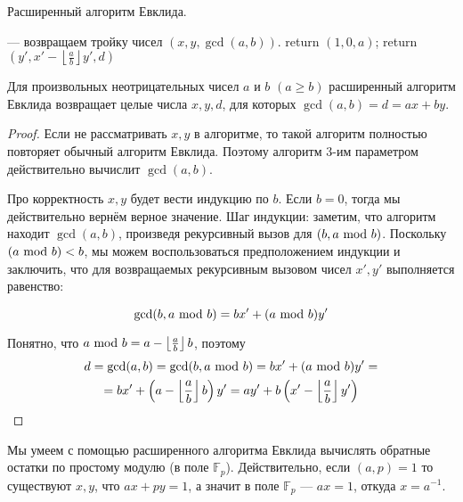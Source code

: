 \documentclass[a4paper, 12pt]{article}
\begin{document}
\begin{algorithm}
  \caption{Расширенный алгоритм Евклида.}
  \begin{algorithmic}[1]
     \Comment --- возвращаем тройку чисел $(x, y, \gcd(a, b))$.
        \State return $(1, 0, a)$;
      \EndIf
      \State return $(y', x' - \left\lfloor\frac{a}{b}\right\rfloor y', d)$
    \EndFunction
  \end{algorithmic}
\end{algorithm}

\begin{Lemma}
  Для произвольных неотрицательных чисел $a$ и $b$ $(a \geqslant b)$ расширенный
алгоритм Евклида возвращает целые числа $x, y, d$, для которых $\gcd(a, b) = d = ax + by$.
\end{Lemma}

\begin{proof}
  Если не рассматривать $x, y$ в алгоритме, то такой алгоритм полностью
  повторяет обычный алгоритм Евклида. Поэтому алгоритм 3-им параметром 
  действительно вычислит $\gcd(a, b)$.

  Про корректность $x, y$ будет вести индукцию по $b$. Если $b = 0$, тогда мы действительно вернём верное значение. Шаг индукции: заметим, что алгоритм находит $\gcd(a, b)$, произведя рекурсивный вызов для $(b, a \ \text{mod} \  b)$. Поскольку $(a \ \text{mod} \  b) < b$, мы можем
  воспользоваться предположением индукции и заключить, что для возвращаемых рекурсивным вызовом чисел $x', y'$ выполняется равенство:

  \[
    \gcd(b, a \ \text{mod} \  b) = bx' + (a \ \text{mod} \  b)y'
  \]

  Понятно, что $a \ \text{mod} \  b = a - \left\lfloor\frac{a}{b}\right\rfloor b$, поэтому
  \begin{multline*}
    d = \gcd(a, b) = \gcd(b, a \ \text{mod} \  b) = bx' + (a \ \text{mod} \  b)y' =\\
    = bx' + \left(a - \left\lfloor\frac{a}{b}\right\rfloor b\right)y' = 
    ay' + b\left(x' - \left\lfloor\frac{a}{b}\right\rfloor y'\right)
  \end{multline*}
\end{proof}

\begin{Examples}
  Мы умеем с помощью расширенного алгоритма Евклида вычислять обратные остатки по
  простому модулю (в поле $\mathbb{F}_p$). Действительно, если $(a, p) = 1$ то
  существуют $x, y$, что $ax + py = 1$, а значит в поле $\mathbb{F}_p$ ---
  $ax = 1$, откуда $x = a^{-1}$.
\end{Examples}
\end{document}
